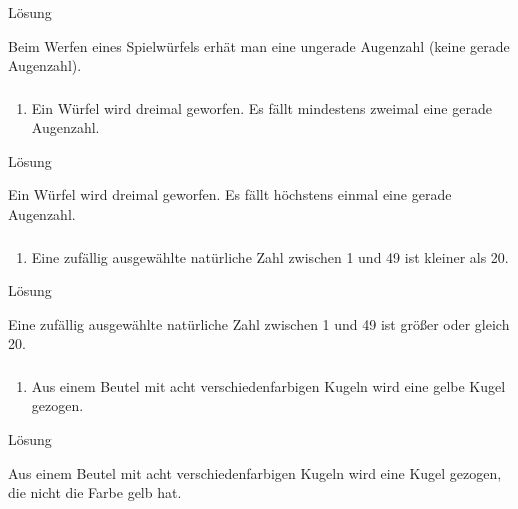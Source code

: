 \documentclass[
  ngerman,
]{book}
\providecommand{\tightlist}{%
  \setlength{\itemsep}{0pt}\setlength{\parskip}{0pt}}
\begin{document}
Lösung

Beim Werfen eines Spielwürfels erhät man eine ungerade Augenzahl (keine gerade Augenzahl).

\hypertarget{section-161}{%
\subsubsection*{}\label{section-161}}

\begin{enumerate}
\def\labelenumi{\alph{enumi})}
\setcounter{enumi}{1}
\tightlist
\item
  Ein Würfel wird dreimal geworfen. Es fällt mindestens zweimal eine gerade Augenzahl.
\end{enumerate}

Lösung

Ein Würfel wird dreimal geworfen. Es fällt höchstens einmal eine gerade Augenzahl.

\hypertarget{section-162}{%
\subsubsection*{}\label{section-162}}

\begin{enumerate}
\def\labelenumi{\alph{enumi})}
\setcounter{enumi}{2}
\tightlist
\item
  Eine zufällig ausgewählte natürliche Zahl zwischen 1 und 49 ist kleiner als 20.
\end{enumerate}

Lösung

Eine zufällig ausgewählte natürliche Zahl zwischen 1 und 49 ist größer oder gleich 20.

\hypertarget{section-163}{%
\subsubsection*{}\label{section-163}}

\begin{enumerate}
\def\labelenumi{\alph{enumi})}
\setcounter{enumi}{3}
\tightlist
\item
  Aus einem Beutel mit acht verschiedenfarbigen Kugeln wird eine gelbe Kugel gezogen.
\end{enumerate}

Lösung

Aus einem Beutel mit acht verschiedenfarbigen Kugeln wird eine Kugel gezogen, die nicht die Farbe gelb hat.
\end{document}
